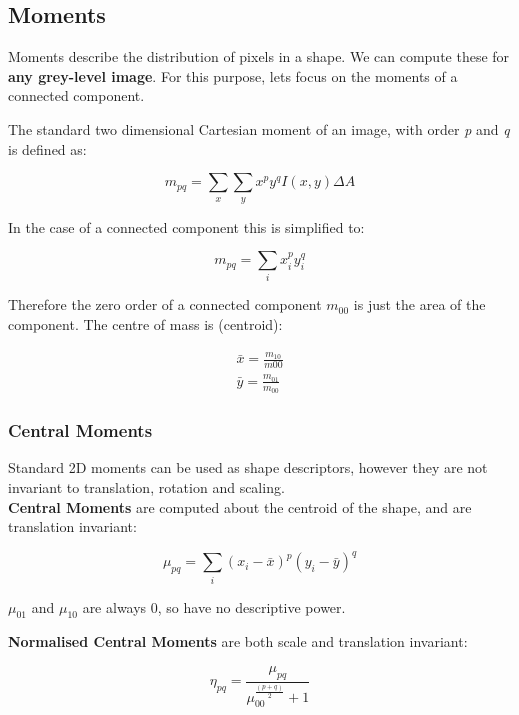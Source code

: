\subsection{Moments}

Moments describe the distribution of pixels in a shape. We can compute these for \textbf{any grey-level image}. For this purpose, lets focus on the moments of a connected component.

\noindent The standard two dimensional Cartesian moment of an image, with order \textit{p} and \textit{q} is defined as:

\begin{equation}
    m_{pq} = \sum_{x}\sum_{y}x^{p}y^{q} I(x,y)\Delta A
\end{equation}

\noindent In the case of a connected component this is simplified to:

\begin{equation}
    m_{pq} = \sum_{i}x_{i}^{p}y_{i}^{q} 
\end{equation}

Therefore the zero order of a connected component $m_{00}$ is just the area of the component. The centre of mass is (centroid):

\begin{align}
    \bar{x} = \frac{m_{10}}{m00} \\
    \bar{y} = \frac{m_{01}}{m_{00}}
\end{align}

\subsubsection{Central Moments}

Standard 2D moments can be used as shape descriptors, however they are not invariant to translation, rotation and scaling.
\\
\noindent \textbf{Central Moments} are computed about the centroid of the shape, and are translation invariant:

\begin{equation}
    \mu_{pq} = \sum_{i} (x_{i} - \bar{x})^{p} (y_{i} - \bar{y})^{q}
\end{equation}

\noindent $\mu_{01}$ and $\mu_{10}$ are always 0, so have no descriptive power.

\noindent\textbf{Normalised Central Moments} are both scale and translation invariant:

\begin{equation}
    \eta_{pq} = \frac{\mu_{pq}}{\mu_{00}^{\frac{(p+q)}{2}}+1}
\end{equation}

